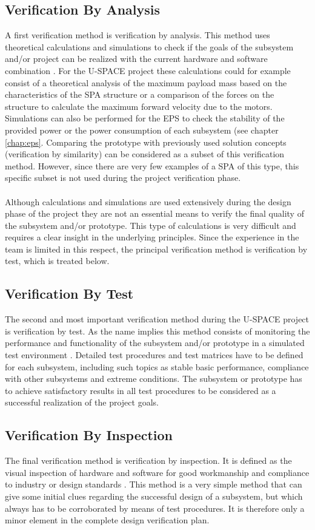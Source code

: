 \subsection{Verification By Analysis}
%
A first verification method is verification by analysis. This method uses theoretical calculations and simulations to check if the goals of the subsystem and/or project can be realized with the current hardware and software combination \cite{ECSS_verification}. For the \ac{U-SPACE} project these calculations could for example consist of a theoretical analysis of the maximum payload mass based on the characteristics of the \ac{SPA} structure or a comparison of the forces on the structure to calculate the maximum forward velocity due to the motors. Simulations can also be performed for the \ac{EPS} to check the stability of the provided power or the power consumption of each subsystem (see chapter \ref{chap:eps}. Comparing the prototype with previously used solution concepts (verification by similarity) can be considered as a subset of this verification method. However, since there are very few examples of a \ac{SPA} of this type, this specific subset is not used during the project verification phase.
\\
\\
Although calculations and simulations are used extensively during the design phase of the project they are not an essential means to verify the final quality of the subsystem and/or prototype. This type of calculations is very difficult and requires a clear insight in the underlying principles. Since the experience in the team is limited in this respect, the principal verification method is verification by test, which is treated below.
%
\subsection{Verification By Test}
%
The second and most important verification method during the \ac{U-SPACE} project is verification by test. As the name implies this method consists of monitoring the performance and functionality of the subsystem and/or prototype in a simulated test environment \cite{ECSS_verification}. Detailed test procedures and test matrices have to be defined for each subsystem, including such topics as stable basic performance, compliance with other subsystems and extreme conditions. The subsystem or prototype has to achieve satisfactory results in all test procedures to be considered as a successful realization of the project goals.
%
\subsection{Verification By Inspection}
%
The final verification method is verification by inspection. It is defined as the visual inspection of hardware and software for good workmanship and compliance to industry or design standards \cite{ECSS_verification}. This method is a very simple method that can give some initial clues regarding the successful design of a subsystem, but which always has to be corroborated by means of test procedures. It is therefore only a minor element in the complete design verification plan.
%
%
